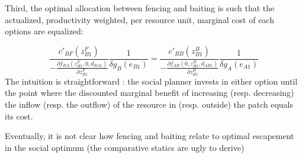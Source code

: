 \documentclass{article}
\begin{document}
Third, the optimal allocation between fencing and baiting is such that the actualized, productivity weighted, per resource unit, marginal cost of each options are equalized: 

$$
\frac{c'_{BF}(z_{B1}^F)}{- \frac{\partial f_{BA}(z_{B1}^F, 0, d_{BA1})}{\partial z_{B1}^F}}\frac{1}{\delta g_{B}(e_{B1})} = \frac{c'_{BB}(z_{B1}^B)}{- \frac{\partial f_{AB}(0, z_{B1}^B, d_{AB1})}{\partial z_{B1}^B}}\frac{1}{\delta g_{A}(e_{A1})}
$$
The intuition is straightforward : the social planner invests in either option until the point where the discounted marginal benefit of increasing (resp. decreasing) the inflow (resp. the outflow) of the resource in (resp. outside) the patch equals its cost.

Eventually, it is not clear how fencing and baiting relate to optimal escapement in the social optimum (the comparative statics are ugly to derive)
\end{document}
